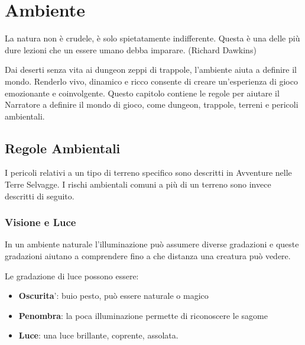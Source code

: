 \documentclass[a4paper,11pt,twoside,openany]{book}
\begin{document}
\pagebreak

\section{Ambiente}

\label{ambiente}
\begin{tcolorbox}[enhanced,arc=5pt,boxrule=0.3pt]{La natura non è crudele, è solo spietatamente indifferente. Questa è una delle più dure lezioni che un essere umano debba imparare. (Richard Dawkins)}\end{tcolorbox}\medskip

Dai deserti senza vita ai dungeon zeppi di trappole, l'ambiente aiuta a definire il mondo. Renderlo vivo, dinamico e ricco consente di creare un'esperienza di gioco emozionante e coinvolgente. Questo capitolo contiene le regole per aiutare il Narratore a definire il mondo di gioco, come dungeon, trappole, terreni e pericoli ambientali.

\subsection{Regole Ambientali}

\label{regole-ambientali}

I pericoli relativi a un tipo di terreno specifico sono descritti in Avventure nelle Terre Selvagge. I rischi ambientali comuni a più di un terreno sono invece descritti di seguito.

\subsubsection{Visione e Luce}

\label{visione-e-luce}

In un ambiente naturale l'illuminazione può assumere diverse gradazioni e queste gradazioni aiutano a comprendere fino a che distanza una creatura può vedere.

Le gradazione di luce possono essere:
\begin{itemize}
	\item
	      \textbf{Oscurita}': buio pesto, può essere naturale o magico
	\item
	      \textbf{Penombra}: la poca illuminazione permette di riconoscere le
	      sagome
	\item
	      \textbf{Luce}: una luce brillante, coprente, assolata.
\end{itemize}
\end{document}
